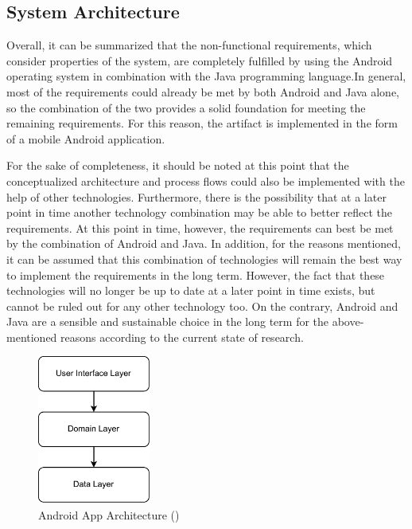 \subsection{System Architecture}

Overall, it can be summarized that the non-functional requirements, which consider properties of the system, are completely fulfilled by using the Android operating system in combination with the Java programming language.In general, most of the requirements could already be met by both Android and Java alone, so the combination of the two provides a solid foundation for meeting the remaining requirements. For this reason, the artifact is implemented in the form of a mobile Android application.

For the sake of completeness, it should be noted at this point that the conceptualized architecture and process flows could also be implemented with the help of other technologies. Furthermore, there is the possibility that at a later point in time another technology combination may be able to better reflect the requirements. At this point in time, however, the requirements can best be met by the combination of Android and Java. In addition, for the reasons mentioned, it can be assumed that this combination of technologies will remain the best way to implement the requirements in the long term. However, the fact that these technologies will no longer be up to date at a later point in time exists, but cannot be ruled out for any other technology too. On the contrary, Android and Java are a sensible and sustainable choice in the long term for the above-mentioned reasons according to the current state of research.

\begin{figure}[htbp]
    \centering
    \includegraphics[width=0.33\textwidth, keepaspectratio]{content/05_design_and_dev_artefacts/ArchitectureBestPracticeAndroid.drawio.pdf}
    \caption[Android App Architecture]{Android App Architecture (\cite{Google.2023})}    
    \label{fig:androidAppArchitecture}
\end{figure}

